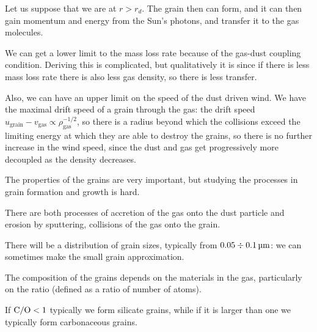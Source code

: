 \documentclass[main.tex]{subfiles}
\begin{document}
Let us suppose that we are at \(r > r_d\). 
The grain then can form, and it can then gain momentum and energy from the Sun's photons, and transfer it to the gas molecules. 

We can get a lower limit to the mass loss rate because of the gas-dust coupling condition. Deriving this is complicated, but qualitatively it is since if there is less mass loss rate there is also less gas density, so there is less transfer. 

Also, we can have an upper limit on the speed of the dust driven wind. We have the maximal drift speed of a grain through the gas: the drift speed \(u_{\text{grain}} - v _{\text{gas}} \propto \rho _{\text{gas}}^{-1/2}\), so there is a radius beyond which the collisions exceed the limiting energy at which they are able to destroy the grains, so there is no further increase in the wind speed, since the dust and gas get progressively more decoupled as the density decreases. 

The properties of the grains are very important, but studying the processes in grain formation and growth is hard. 

There are both processes of accretion of the gas onto the dust particle and erosion by sputtering, collisions of the gas onto the grain. 

There will be a distribution of grain sizes, typically from \(\num{.05} \divisionsymbol \SI{.1}{\micro\metre}\): we can sometimes make the small grain approximation. 

The composition of the grains depends on the materials in the gas, particularly on the  ratio (defined as a ratio of number of atoms).

If \(\ce{C/O} <1\) typically we form silicate grains, while if it is larger than one we typically form carbonaceous grains. 
\end{document}
